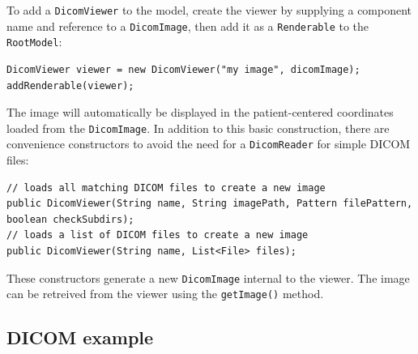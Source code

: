 To add a \lstinline{DicomViewer} to the model, create the viewer by supplying a component name
and reference to a \lstinline{DicomImage}, then add it as a \lstinline{Renderable} to the \lstinline{RootModel}:
\begin{lstlisting}[]
DicomViewer viewer = new DicomViewer("my image", dicomImage);
addRenderable(viewer);
\end{lstlisting}
The image will automatically be displayed in the patient-centered coordinates loaded 
from the \lstinline{DicomImage}.  In addition to this basic construction, there 
are convenience constructors to avoid the need for a \lstinline{DicomReader}
for simple DICOM files:
\begin{lstlisting}[]
// loads all matching DICOM files to create a new image
public DicomViewer(String name, String imagePath, Pattern filePattern, boolean checkSubdirs);
// loads a list of DICOM files to create a new image
public DicomViewer(String name, List<File> files);
\end{lstlisting}
These constructors generate a new \lstinline{DicomImage} internal to the viewer.  The image
can be retreived from the viewer using the \lstinline{getImage()} method.

\subsection{DICOM example}


